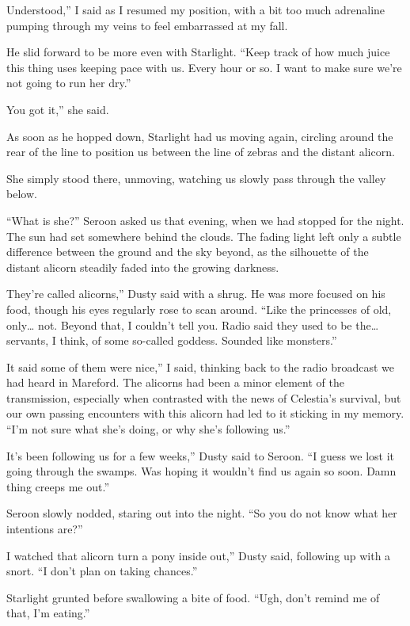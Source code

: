 \leavevmode{}Understood,” I said as I resumed my position, with a bit too much adrenaline pumping through my veins to feel embarrassed at my fall.

He slid forward to be more even with Starlight. “Keep track of how much juice this thing uses keeping pace with us. Every hour or so. I want to make sure we’re not going to run her dry.”

\leavevmode{}You got it,” she said.

As soon as he hopped down, Starlight had us moving again, circling around the rear of the line to position us between the line of zebras and the distant alicorn.

She simply stood there, unmoving, watching us slowly pass through the valley below.

{\br}%
“What is she?” Seroon asked us that evening, when we had stopped for the night. The sun had set somewhere behind the clouds. The fading light left only a subtle difference between the ground and the sky beyond, as the silhouette of the distant alicorn steadily faded into the growing darkness.

\leavevmode{}They’re called alicorns,” Dusty said with a shrug. He was more focused on his food, though his eyes regularly rose to scan around. “Like the princesses of old, only… not. Beyond that, I couldn’t tell you. Radio said they used to be the… servants, I think, of some so-called goddess. Sounded like monsters.”

\leavevmode{}It said some of them were nice,” I said, thinking back to the radio broadcast we had heard in Mareford. The alicorns had been a minor element of the transmission, especially when contrasted with the news of Celestia’s survival, but our own passing encounters with this alicorn had led to it sticking in my memory. “I’m not sure what she’s doing, or why she’s following us.”

\leavevmode{}It’s been following us for a few weeks,” Dusty said to Seroon. “I guess we lost it going through the swamps. Was hoping it wouldn’t find us again so soon. Damn thing creeps me out.”

Seroon slowly nodded, staring out into the night. “So you do not know what her intentions are?”

\leavevmode{}I watched that alicorn turn a pony inside out,” Dusty said, following up with a snort. “I don’t plan on taking chances.”

Starlight grunted before swallowing a bite of food. “Ugh, don’t remind me of that, I’m eating.”

